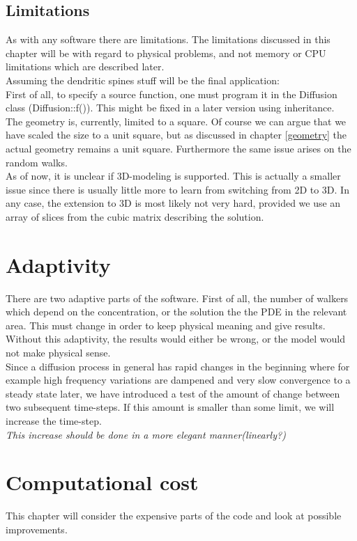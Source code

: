 \subsection{Limitations}

As with any software there are limitations. The limitations discussed in this chapter will be with regard to physical problems, and not memory or CPU limitations which are described later. \\
Assuming the dendritic spines stuff will be the final application:\\
First of all, to specify a source function, one must program it in the Diffusion class (Diffusion::f()). This might be fixed in a later version using inheritance.\\
The geometry is, currently, limited to a square. Of course we can argue that we have scaled the size to a unit square, but as discussed in chapter \ref{geometry} the actual geometry remains a unit square. 
Furthermore the same issue arises on the random walks. \\
As of now, it is unclear if 3D-modeling is supported. This is actually a smaller issue since there is usually little more to learn from switching from 2D to 3D. In any case, the extension to 3D is most likely not very hard, provided we use an array of slices from the cubic matrix describing the solution.

\section{Adaptivity}

There are two adaptive parts of the software. First of all, the number of walkers which depend on the concentration, or the solution the the PDE in the relevant area. This must change in order to keep physical meaning and give results. Without this adaptivity, the results would either be wrong, or the model would not make physical sense.\\
Since a diffusion process in general has rapid changes in the beginning where for example high frequency variations are dampened and very slow convergence to a steady state later, we have introduced a test of the amount of change between two subsequent time-steps. If this amount is smaller than some limit, we will increase the time-step.\\
\emph{This increase should be done in a more elegant manner(linearly?)}

\section{Computational cost}
This chapter will consider the expensive parts of the code and look at possible improvements.

